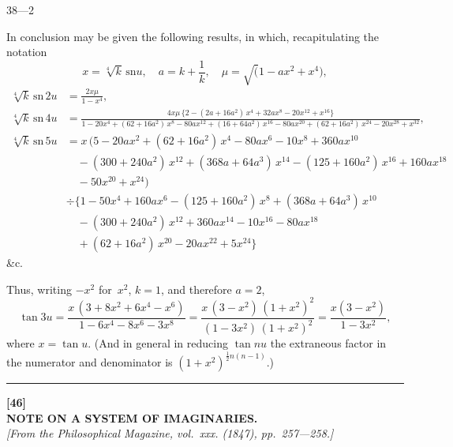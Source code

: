 \documentclass[11pt,a4paper]{article}
\newcommand{\sno}{\mathrm{sn}}
\begin{document}
\begin{center}
38---2
\end{center}

\newpage
In conclusion may be given the following results, in which, recapitulating the notation
\[
x = \sqrt[4]{k}\,\sno u, \quad a = k + \frac{1}{k}, \quad \mu = \surd(1 - ax^2 + x^4),
\]
\begin{align*}
\sqrt[4]{k}\,\sno\,2u &= \frac{2x\mu}{1-x^4},\\
\sqrt[4]{k}\,\sno\,4u &= \frac{4x\mu\,\{2 - (2a+16a^2)\,x^4 + 32ax^8 - 20x^{12} + x^{16}\}}{1 - 20x^4 + (62+16a^2)\,x^8 - 80ax^{12} + (16+64a^2)\,x^{16} - 80ax^{20} + (62+16a^2)\,x^{24} - 20x^{28} + x^{32}},\\
\sqrt[4]{k}\,\sno\,5u &= x\,(5 - 20ax^2 + (62+16a^2)\,x^4 - 80ax^6 - 10x^8 + 360ax^{10} \\
  &\quad- (300+240a^2)\,x^{12} + (368a+64a^3)\,x^{14} - (125+160a^2)\,x^{16} + 160ax^{18} \\
  &\quad- 50x^{20} + x^{24}) \\
  &\div\{1 - 50x^4 + 160ax^6 - (125+160a^2)\,x^8 + (368a+64a^3)\,x^{10} \\
  &\quad- (300+240a^2)\,x^{12} + 360ax^{14} - 10x^{16} - 80ax^{18} \\
  &\quad+ (62+16a^2)\,x^{20} - 20ax^{22} + 5x^{24}\}
\end{align*}
\&c.

Thus, writing $-x^2$ for~$x^2$, $k=1$, and therefore $a=2$,
\[
\tan 3u = \frac{x\,(3+8x^2+6x^4-x^6)}{1-6x^4-8x^6-3x^8} = \frac{x\,(3-x^2)\,(1+x^2)^2}{(1-3x^2)\,(1+x^2)^2} = \frac{x(3-x^2)}{1-3x^2},
\]
where $x = \tan u$. (And in general in reducing $\tan nu$ the extraneous factor in the numerator and denominator is $(1+x^2)^{\frac{1}{2}n(n-1)}$.)

\vspace{20pt}
\begin{center}
\rule{0.5\textwidth}{0.4pt}
\end{center}


\newpage
{}
\begin{center}
\textbf{[46]}\\[4pt]
\textbf{\large NOTE ON A SYSTEM OF IMAGINARIES.}\\[4pt]
\textit{[From the Philosophical Magazine, vol.~xxx. (1847), pp.~257---258.]}
\end{center}
\end{document}
